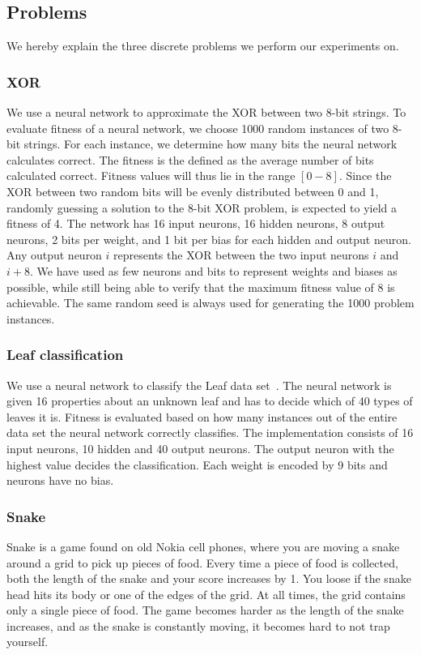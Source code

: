 \subsection{Problems}
\label{sec:problems}
We hereby explain the three discrete problems we perform our experiments on.

\subsubsection{XOR}
We use a neural network to approximate the XOR between two 8-bit strings.
To evaluate fitness of a neural network, we choose 1000 random instances of two 8-bit strings.
For each instance, we determine how many bits the neural network calculates correct.
The fitness is the defined as the average number of bits calculated correct.
Fitness values will thus lie in the range $[0-8]$.
Since the XOR between two random bits will be evenly distributed between 0 and 1,
randomly guessing a solution to the 8-bit XOR problem, is expected to yield a fitness of 4.
The network has 16 input neurons, 16 hidden neurons, 8 output neurons, 2 bits per weight, and 1 bit per bias for each hidden and output neuron.
Any output neuron $i$ represents the XOR between the two input neurons $i$ and $i+8$. 
We have used as few neurons and bits to represent weights and biases as possible, while still being able to verify that the maximum fitness value of 8 is achievable.
The same random seed is always used for generating the 1000 problem instances.

\subsubsection{Leaf classification}
We use a neural network to classify the Leaf data set~\cite{Bache+Lichman:2013, leafdataset}.
The neural network is given 16 properties about an unknown leaf and has to decide which of 40 types of leaves it is.
Fitness is evaluated based on how many instances out of the entire data set the neural network correctly classifies.
The implementation consists of 16 input neurons, 10 hidden and 40 output neurons. The output neuron with the highest value decides the classification. Each weight is encoded by 9 bits and neurons have no bias.

\subsubsection{Snake}
Snake is a game found on old Nokia cell phones, where you are moving a snake around a grid to pick up pieces of food.
Every time a piece of food is collected, both the length of the snake and your score increases by 1.
You loose if the snake head hits its body or one of the edges of the grid.
At all times, the grid contains only a single piece of food.
The game becomes harder as the length of the snake increases, and as the snake is constantly moving, it becomes hard to not trap yourself.

